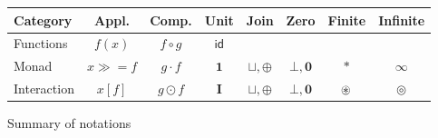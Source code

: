\documentclass[acmsmall,timestamp,review,anonymous]{acmart}
\newcommand{\kw}[1]{\ensuremath{ \mathsf{#1} }}
\newcommand{\bind}{\gg\!\!=}
\begin{document}
%


\begin{figure} %
  \begin{center}
    \begin{tabular}{lccccccc}
      \hline
      Category & Appl. & Comp. & Unit & Join & Zero & Finite & Infinite \\
      \hline
      Functions & $f(x)$ & $f \circ g$ & \kw{id} & & & \\
      Monad &
        $x \bind f$ & $g \cdot f$ & $\mathbf{1}$ &
        ${\sqcup}, {\oplus}$ & $\bot, \mathbf{0}$ & $*$ & $\infty$ \\
      Interaction &
        $x[f]$ & $g \odot f$ & $\mathbf{I}$ &
        ${\sqcup}, {\oplus}$ & $\bot, \mathbf{0}$ & $\oast$ & $\circledcirc$ \\
      \hline
    \end{tabular}
  \end{center}
  \caption{Summary of notations}
  \label{fig:notations}
\end{figure}

\end{document}
